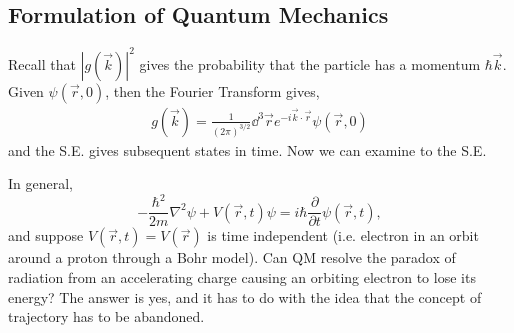 \documentclass{article}
\numberwithin{equation}{section}
\begin{document}
\subsection{Formulation of Quantum Mechanics}
Recall that $|g(\vec{k})|^2$ gives the probability that the particle has a momentum $\hbar \vec{k}$. Given $\psi(\vec{r},0)$, then the Fourier Transform gives,
\begin{align*}
    g(\vec{k}) = \frac{1}{(2\pi)^{3/2}}\dd^3{\vec{r}}e^{-i\vec{k}\cdot \vec{r}}\psi(\vec{r},0)
\end{align*}
and the S.E. gives subsequent states in time. Now we can examine  to the S.E.

In general,
\begin{equation*}
    -\frac{\hbar^2}{2m}\nabla^2 \psi + V(\vec{r},t)\psi = i\hbar \frac{\partial}{\partial t}\psi(\vec{r},t),
\end{equation*}
and suppose $V(\vec{r},t) = V(\vec{r})$ is time independent (i.e. electron in an orbit around a proton through a Bohr model). Can QM resolve the paradox of radiation from an accelerating charge causing an orbiting electron to lose its energy? The answer is yes, and it has to do with the idea that the concept of trajectory has to be abandoned.
\end{document}
